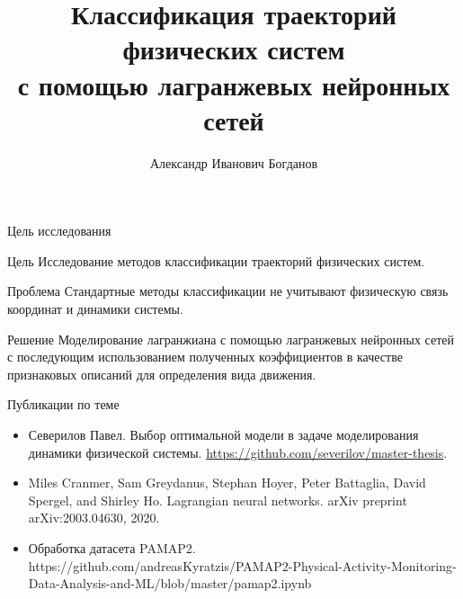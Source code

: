 \documentclass{beamer}
\title[\hbox to 56mm{Классификация траекторий физических систем}]{Классификация траекторий физических систем\\ с помощью лагранжевых нейронных сетей}
\author[А.\,И.~Богданов]{Александр Иванович Богданов}
\institute{Московский физико-технический институт}
\date{\footnotesize
\par\smallskip\emph{Курс:} Моя первая научная статья
\par\smallskip\emph{Эксперт:} В.\,В.~Стрижов
\par\smallskip\emph{Консультант:} С.\,К.~Панченко
\par\bigskip\small 2023}
\begin{document}

\begin{frame}

    \thispagestyle{empty}
    \maketitle
    
\end{frame}


\begin{frame}{Цель исследования}
    \begin{block}{Цель}
        Исследование методов классификации траекторий физических систем.
    \end{block}
    \begin{block}{Проблема}
        Стандартные методы классификации не учитывают физическую связь координат и динамики системы.
    \end{block}
    \begin{block}{Решение}
        Моделирование лагранжиана с помощью лагранжевых нейронных сетей с последующим использованием полученных коэффициентов в качестве признаковых описаний для определения вида движения.
    \end{block}
\end{frame}


\begin{frame}{Публикации по теме}
    \begin{itemize}
    
    \item Северилов Павел. Выбор оптимальной модели в задаче моделирования динамики физической системы. \url{https://github.com/severilov/master-thesis}.

    \item Miles Cranmer, Sam Greydanus, Stephan Hoyer, Peter Battaglia, David Spergel, and Shirley Ho. Lagrangian neural networks. arXiv preprint arXiv:2003.04630, 2020.

    \item Обработка датасета PAMAP2. https://github.com/andreasKyratzis/PAMAP2-Physical-Activity-Monitoring-Data-Analysis-and-ML/blob/master/pamap2.ipynb
  
    \end{itemize}
\end{frame}
\end{document}
